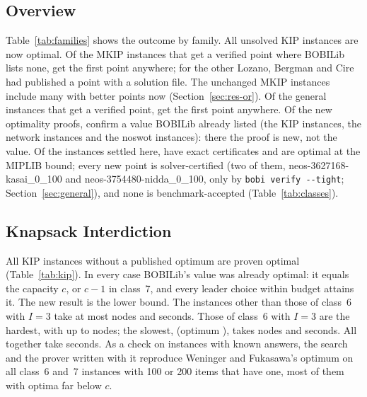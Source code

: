\documentclass[]{spie}  %
\theoremstyle{plain}
\newcommand{\code}[1]{\texttt{#1}}
\newcommand{\inst}[1]{\mbox{#1}}             %
\begin{document}
\subsection{Overview}\label{sec:res-overview}

Table~\ref{tab:families} shows the outcome by family. All \NumKipUnsolved{} unsolved KIP instances
are now optimal. Of the \NumOrFirstPoints{} MKIP instances that get a verified point where BOBILib
lists none, \NumOrFirstAnywhere{} get the first point anywhere; for the other
\NumOrPointNewToBobilib{} Lozano, Bergman and Cire had published a point with a solution file. The
\NumMkipUnchanged{} unchanged MKIP instances include many with better points now
(Section~\ref{sec:res-or}). Of the \NumGeneralFirstPoints{} general instances that get a verified
point, \NumGeneralFirstAnywhere{} get the first point anywhere. Of the \NumNewOptimal{} new
optimality proofs, \NumNewValueKnown{} confirm a value BOBILib already listed (the \NumNewKip{} KIP
instances, the \NumNewNetwork{} network instances and the \NumNewValueKnownGeneral{} \inst{noswot}
instances): there the proof is new, not the value. Of the \NumSettledHere{} instances settled
here, \NumClassExactSettled{} have exact certificates and \NumClassNumericalNew{} are optimal at
the MIPLIB bound; every new point is solver-certified (two of them, \inst{neos-3627168-kasai\_0\_100}
and \inst{neos-3754480-nidda\_0\_100}, only by \code{bobi verify -{}-tight}; Section~\ref{sec:general}),
and none is benchmark-accepted (Table~\ref{tab:classes}).

\subsection{Knapsack Interdiction}\label{sec:res-kip}

All \NumNewKip{} KIP instances without a published optimum are proven optimal
(Table~\ref{tab:kip}). In every case BOBILib's value was already optimal: it equals the capacity
$c$, or $c-1$ in class~7, and every leader choice within budget attains it. The new result is the
lower bound. The \NumKipEasy{} instances other than those of class~6 with $I=3$ take at
most \KipEasyMaxNodes{} nodes and \KipEasyMaxCpu{} seconds. Those of class~6 with $I=3$
are the hardest, with up to \KipMostNodes{} nodes; the slowest, \inst{\KipHardestName}
(optimum \KipHardestOptimum), takes \KipHardestNodes{} nodes and \KipHardestCpu{} seconds. All
\NumNewKip{} together take \KipTotalCpu{} seconds. As a check on instances with known answers, the
search and the prover written with it reproduce Weninger and Fukasawa's optimum on all
\NumKipValidation{} class~6 and~7 instances with 100 or 200 items that have one, most of them with
optima far below $c$.
\end{document}
